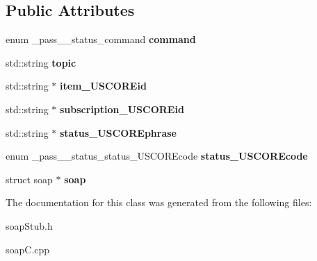 \subsection*{Public Attributes}
\begin{DoxyCompactItemize}
\item 
\hypertarget{classpass____status_ae6b13bc34bd14af29ae7385a9d14684c}{
enum \_\-pass\_\-\_\-status\_\-command {\bfseries command}}
\label{classpass____status_ae6b13bc34bd14af29ae7385a9d14684c}

\item 
\hypertarget{classpass____status_ae3e35c8e2d847ad127e7e0f48eba86fd}{
std::string {\bfseries topic}}
\label{classpass____status_ae3e35c8e2d847ad127e7e0f48eba86fd}

\item 
\hypertarget{classpass____status_aacb4ff65568836017f3ac0322223e1df}{
std::string $\ast$ {\bfseries item\_\-USCOREid}}
\label{classpass____status_aacb4ff65568836017f3ac0322223e1df}

\item 
\hypertarget{classpass____status_aba302655348ba1f850d29a75c9a40661}{
std::string $\ast$ {\bfseries subscription\_\-USCOREid}}
\label{classpass____status_aba302655348ba1f850d29a75c9a40661}

\item 
\hypertarget{classpass____status_a5eb8a796003b72acf74b8a960cc5a431}{
std::string $\ast$ {\bfseries status\_\-USCOREphrase}}
\label{classpass____status_a5eb8a796003b72acf74b8a960cc5a431}

\item 
\hypertarget{classpass____status_adc96e3678d57f670e774009c2c30140f}{
enum \_\-pass\_\-\_\-status\_\-status\_\-USCOREcode {\bfseries status\_\-USCOREcode}}
\label{classpass____status_adc96e3678d57f670e774009c2c30140f}

\item 
\hypertarget{classpass____status_a5d8938baba4a8b87faffd86fed8ab419}{
struct soap $\ast$ {\bfseries soap}}
\label{classpass____status_a5d8938baba4a8b87faffd86fed8ab419}

\end{DoxyCompactItemize}


The documentation for this class was generated from the following files:\begin{DoxyCompactItemize}
\item 
soapStub.h\item 
soapC.cpp\end{DoxyCompactItemize}
